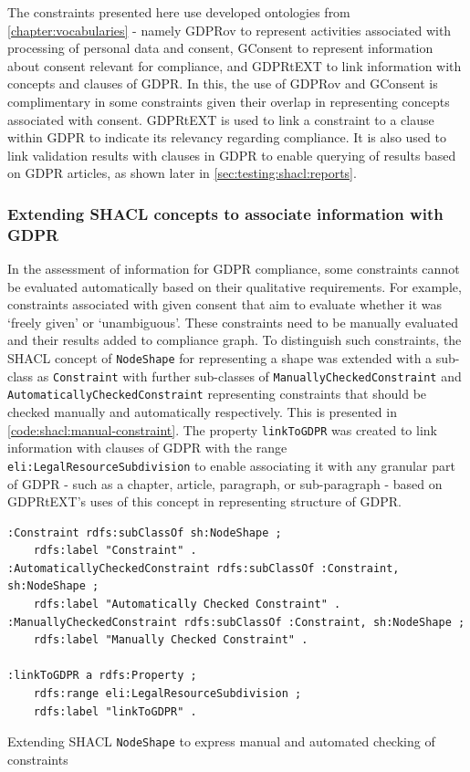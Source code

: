 The constraints presented here use developed ontologies from \autoref{chapter:vocabularies} - namely GDPRov to represent activities associated with processing of personal data and consent, GConsent to represent information about consent relevant for compliance, and GDPRtEXT to link information with concepts and clauses of GDPR.
In this, the use of GDPRov and GConsent is complimentary in some constraints given their overlap in representing concepts associated with consent.
GDPRtEXT is used to link a constraint to a clause within GDPR to indicate its relevancy regarding compliance. It is also used to link validation results with clauses in GDPR to enable querying of results based on GDPR articles, as shown later in \autoref{sec:testing:shacl:reports}.

\subsubsection{Extending SHACL concepts to associate information with GDPR}
In the assessment of information for GDPR compliance, some constraints cannot be evaluated automatically based on their qualitative requirements. For example, constraints associated with given consent that aim to evaluate whether it was `freely given' or `unambiguous'. These constraints need to be manually evaluated and their results added to compliance graph.
To distinguish such constraints, the SHACL concept of \texttt{NodeShape} for representing a shape was extended with a sub-class as \texttt{Constraint} with further sub-classes of \texttt{ManuallyCheckedConstraint} and \texttt{AutomaticallyCheckedConstraint} representing constraints that should be checked manually and automatically respectively. This is presented in \autoref{code:shacl:manual-constraint}.
The property \texttt{linkToGDPR} was created to link information with clauses of GDPR with the range \texttt{eli:LegalResourceSubdivision} to enable associating it with any granular part of GDPR - such as a chapter, article, paragraph, or sub-paragraph - based on GDPRtEXT's uses of this concept in representing structure of GDPR.
\begin{listing}[htbp]
\begin{verbatim}
:Constraint rdfs:subClassOf sh:NodeShape ;
    rdfs:label "Constraint" .
:AutomaticallyCheckedConstraint rdfs:subClassOf :Constraint, sh:NodeShape ;
    rdfs:label "Automatically Checked Constraint" .
:ManuallyCheckedConstraint rdfs:subClassOf :Constraint, sh:NodeShape ;
    rdfs:label "Manually Checked Constraint" .
    
:linkToGDPR a rdfs:Property ;
    rdfs:range eli:LegalResourceSubdivision ;
    rdfs:label "linkToGDPR" .
\end{verbatim}
\caption{Extending SHACL \texttt{NodeShape} to express manual and automated checking of constraints}
\label{code:shacl:manual-constraint}
\end{listing}

